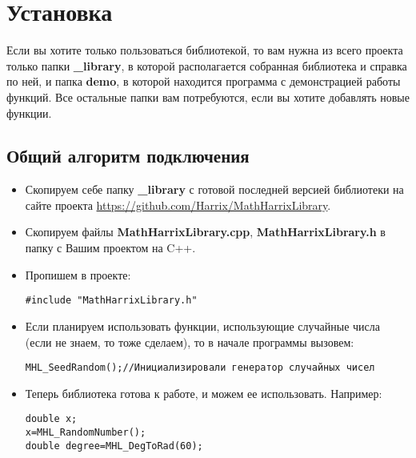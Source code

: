 \documentclass[a4paper,12pt]{article}
\begin{document}
\newpage
\section{Установка}\label{section_install}

Если вы хотите только пользоваться библиотекой, то вам нужна из всего проекта только папки \textbf{\_library}, в которой располагается собранная библиотека и справка по ней, и папка \textbf{demo}, в которой находится программа с демонстрацией работы функций. Все остальные папки вам потребуются, если вы хотите добавлять новые функции.

\subsection{Общий алгоритм подключения}

\begin{itemize}
\item Скопируем себе папку \textbf{\_library} с готовой последней версией библиотеки на сайте проекта \href{https://github.com/Harrix/MathHarrixLibrary}{https://github.com/Harrix/MathHarrixLibrary}.

\item Скопируем файлы \textbf{MathHarrixLibrary.cpp}, \textbf{MathHarrixLibrary.h} в папку с Вашим проектом на C++.

\item Пропишем в проекте:
\begin{lstlisting}[label=install_01,caption=Подключение библиотеки]
#include "MathHarrixLibrary.h"
\end{lstlisting}

\item Если планируем использовать функции, использующие случайные числа (если не знаем, то тоже сделаем), то в начале программы вызовем:
\begin{lstlisting}[label=install_02,caption=Инициализация генератора случайных чисел]
MHL_SeedRandom();//Инициализировали генератор случайных чисел
\end{lstlisting}

\item Теперь библиотека готова к работе, и можем ее использовать. Например:
\begin{lstlisting}[label=install_03,caption=Пример использования]
double x;
x=MHL_RandomNumber();
double degree=MHL_DegToRad(60);
\end{lstlisting}
\end{itemize}
\end{document}
